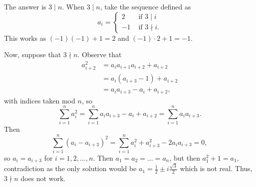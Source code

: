 The answer is $\boxed{3\mid n}$. When $3\mid n$, take the sequence defined as \[a_i=\begin{cases}2&\text{ if }3\mid i\\-1&\text{ if }3\nmid i.\end{cases}\] This works as $\left(-1\right)\left(-1\right)+1=2$ and $\left(-1\right)\cdot2+1=-1$.

Now, suppose that $3\nmid n$. Observe that
\begin{align*}
	a_{i+2}^2&=a_ia_{i+1}a_{i+2}+a_{i+2}\\
	&=a_i\left(a_{i+3}-1\right)+a_{i+2}\\
	&=a_ia_{i+3}-a_i+a_{i+2},
\end{align*}
with indices taken mod $n$, so \[\displaystyle\sum_{i=1}^na_i^2=\displaystyle\sum_{i=1}^na_ia_{i+3}-a_i+a_{i+2}=\displaystyle\sum_{i=1}^na_ia_{i+3}.\] Then \[\displaystyle\sum_{i=1}^n\left(a_i-a_{i+3}\right)^2=\displaystyle\sum_{i=1}^na_i^2+a_{i+3}^2-2a_ia_{i+3}=0,\] so $a_i=a_{i+3}$ for $i=1,2,\ldots,n$. Then $a_1=a_2=\ldots=a_n$, but then $a_1^2+1=a_1$, contradiction as the only solution would be $a_1=\frac{1}{2}\pm i\frac{\sqrt{3}}{2}$ which is not real. Thus, $3\nmid n$ does not work.